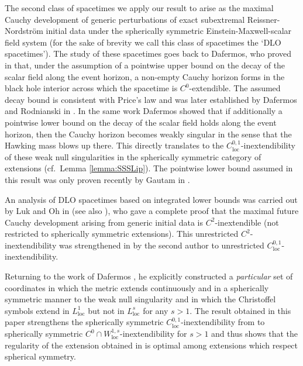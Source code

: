 \documentclass{article}
\newcommand{\loc}{\mathrm{loc}}
\begin{document}
The second class of spacetimes we apply our result to arise as the maximal Cauchy development of generic perturbations of exact subextremal Reissner-Nordstr\"om initial data under the spherically symmetric Einstein-Maxwell-scalar field system (for the sake of brevity we call this class of spacetimes the `DLO spacetimes'). The study of these spacetimes goes back to Dafermos, who proved in \cite{Daf03,Daf05a} that, under the assumption of a pointwise upper bound on the decay of the scalar field along the event horizon, a non-empty Cauchy horizon forms in the black hole interior across which the spacetime is $C^0$-extendible. The assumed decay bound is consistent with Price's law \cite{Price72} and was later established by Dafermos and Rodnianski in \cite{DafRod05}. In the same work \cite{Daf05a} Dafermos showed that if additionally a pointwise lower bound on the decay of the scalar field holds along the event horizon, then the Cauchy horizon becomes weakly singular in the sense that the Hawking mass blows up there. This directly translates to the $C^{0,1}_{\loc}$-inextendibility of these weak null singularities in the spherically symmetric category of extensions (cf.\ Lemma \ref{lemma:SSSLip}). The pointwise lower bound assumed in this result was only proven recently by Gautam in \cite{Gautam}. 

An analysis of DLO spacetimes based on integrated lower bounds was carried out by Luk and Oh in \cite{LukOh19I,LukOh19II} (see also \cite{LukOhShla23}), who gave a complete proof that the maximal future Cauchy development arising from generic initial data is $C^2$-inextendible (not restricted to spherically symmetric extensions). This unrestricted $C^2$-inextendibility was strengthened in  \cite{Sbie22a} by the second author to unrestricted $C^{0,1}_{\loc}$-inextendibility.

Returning to the work of Dafermos \cite{Daf05a}, he explicitly constructed a \emph{particular} set of coordinates in which the metric extends continuously and in a spherically symmetric manner to the weak null singularity and in which the Christoffel symbols extend in $L^1_{\loc}$ but not in $L^{s}_{\loc}$ for any $s>1$. The result obtained in this paper strengthens  the spherically symmetric $C^{0,1}_{\loc}$-inextendibility from \cite{Daf05a} to spherically symmetric $C^0\cap W^{1,s}_{\loc}$-inextendibility for $s>1$ and thus shows that the regularity of the extension obtained in \cite{Daf05a} is optimal among extensions which respect spherical symmetry. 
\end{document}
